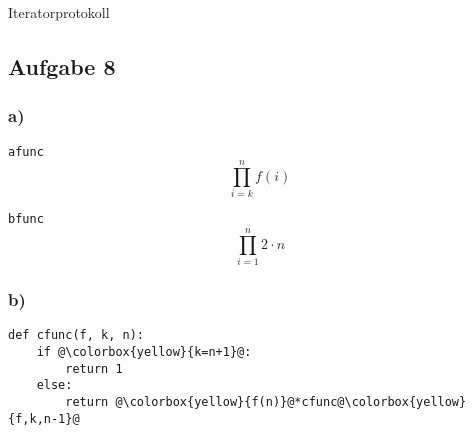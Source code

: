 \documentclass{scrartcl}
\begin{document}
Iteratorprotokoll

\subsection*{Aufgabe 8}

\subsubsection*{a)}
\verb_afunc_
\[ \prod _{i=k} ^n f(i)\]

\verb_bfunc_
\[ \prod _{i=1} ^n 2 \cdot n\]

\subsubsection*{b)}

\begin{lstlisting}[escapechar=@]
def cfunc(f, k, n):
    if @\colorbox{yellow}{k=n+1}@:
        return 1
    else:
        return @\colorbox{yellow}{f(n)}@*cfunc@\colorbox{yellow}{f,k,n-1}@
\end{lstlisting}
\end{document}
